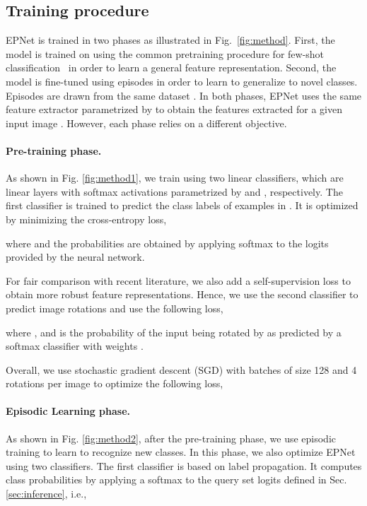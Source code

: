 \documentclass[runningheads]{llncs}
\begin{document}
\subsection{Training procedure}
\label{sec:training-phase}
EPNet is trained in two phases as illustrated in Fig.~\ref{fig:method}. First, the model is trained on  using the common pretraining procedure for few-shot classification~\cite{rusu2018meta} in order to learn a general feature representation. 
Second, the model is fine-tuned using episodes in order to learn to generalize to novel classes. Episodes are drawn from the same dataset . In both phases, EPNet uses the same feature extractor  parametrized by  to obtain the features  extracted for a given input image .
However, each phase relies on a different objective.



\paragraph{Pre-training phase.}
As shown in Fig. \ref{fig:method1}, we train  using two linear classifiers, which are linear layers with softmax activations parametrized by  and , respectively. 
The first classifier is trained to predict the class labels of examples in .
It is optimized by minimizing the cross-entropy loss,


where  and the probabilities are obtained by applying softmax to the logits provided by the neural network.

For fair comparison with recent literature, we also add a self-supervision loss \cite{mangla2019charting,gidaris2019boosting} to obtain more robust feature representations. Hence, we use the second classifier to predict image rotations and use the following loss,

where , and  is the probability of the input being rotated by  as predicted by a softmax classifier with weights .

Overall, we use stochastic gradient descent (SGD) with batches of size 128 and 4 rotations per image to optimize the following loss,

 
\paragraph{Episodic Learning phase.}
As shown in Fig. \ref{fig:method2}, after the pre-training phase, we use episodic training to learn to recognize new classes.
In this phase, we also optimize EPNet using two classifiers.
The first classifier is based on label propagation. It computes class probabilities by applying a softmax to the query set logits  defined in Sec. \ref{sec:inference}, i.e.,
\end{document}
